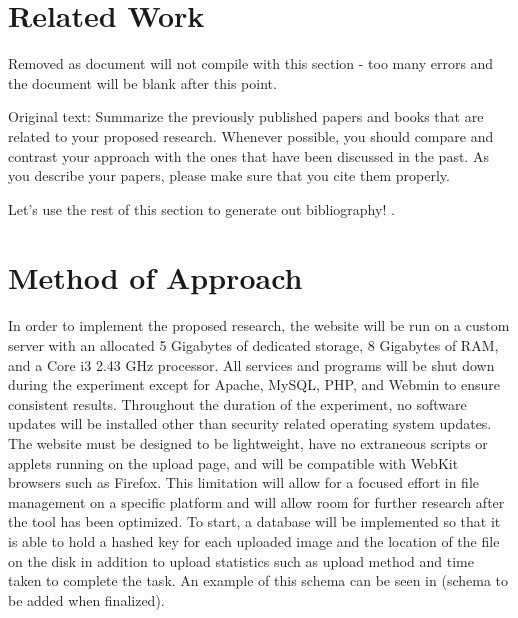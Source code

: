 \documentclass[11pt]{article}
\begin{document}
\section{Related Work}
\label{sec:relatedwork}
\vspace*{-.1in}


Removed as document will not compile with this section - too many errors and the document will be blank after this point.

Original text:
Summarize the previously published papers and books that are related
to your proposed research.  Whenever possible, you should compare and
contrast your approach with the ones that have been discussed in the
past.  As you describe your papers, please make sure that you cite
them properly.

Let's use the rest of this section to generate out bibliography!
\cite{nettuts:pdosqli}
\cite{about:rename}
\cite{php:uploads}
\cite{catpa:gdcode}
\cite{ubuntu:lampsetup}
\cite{nix:gdsetup}
\cite{php:gdimg}
\cite{Foo:2007}
\cite{Srinivasan:2008}
\cite{Lee:2010}.

\vspace*{-.2in}
\section{Method of Approach}
\label{sec:method}
\vspace*{-.1in}

In order to implement the proposed research, the website will be run on a custom server with an allocated 5 Gigabytes of dedicated storage, 8 Gigabytes of RAM, and a Core i3 2.43 GHz processor. All services and programs will be shut down during the experiment except for Apache, MySQL, PHP, and Webmin to ensure consistent results. Throughout the duration of the experiment, no software updates will be installed other than security related operating system updates. The website must be designed to be lightweight, have no extraneous scripts or applets running on the upload page, and will be compatible with WebKit browsers such as Firefox. This limitation will allow for a focused effort in file management on a specific platform and will allow room for further research after the tool has been optimized. To start, a database will be implemented so that it is able to hold a hashed key for each uploaded image and the location of the file on the disk in addition to upload statistics such as upload method and time taken to complete the task. An example of this schema can be seen in (schema to be added when finalized). %
\end{document}
